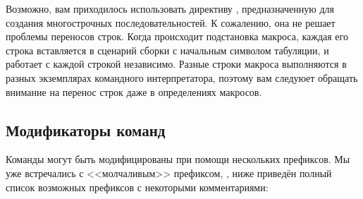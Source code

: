 Возможно, вам приходилось использовать директиву ,
предназначенную для создания многострочных последовательностей. К
сожалению, она не решает проблемы переносов строк. Когда происходит
подстановка макроса, каждая его строка вставляется в сценарий сборки с
начальным символом табуляции, и \GNUmake{} работает с каждой строкой
независимо. Разные строки макроса выполняются в разных экземплярах
командного интерпретатора, поэтому вам следуюет обращать внимание на
перенос строк даже в определениях макросов.

\subsection{Модификаторы команд}
\label{sec:command_modifiers}

Команды могут быть модифицированы при помощи нескольких префиксов.  Мы
уже встречались с <<молчаливым>> префиксом, , ниже приведён
полный список возможных префиксов с некоторыми комментариями:

